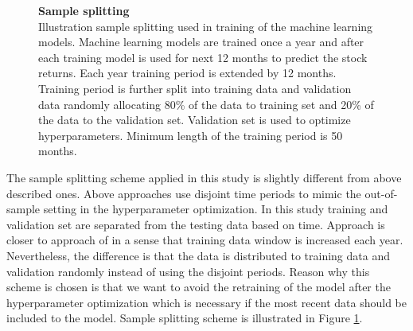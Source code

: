 \documentclass[12pt]{article}
\begin{document}
\begin{figure}[ht]
\centering
\caption[Sample splitting scheme]{\textbf{Sample splitting}\\ Illustration sample splitting used in training of the machine learning models. Machine learning models are trained once a year and after each training model is used for next 12 months to predict the stock returns. Each year training period is extended by 12 months. Training period is further split into training data and validation data randomly allocating 80\% of the data to training set and 20\% of the data to the validation set. Validation set is used to optimize hyperparameters. Minimum length of the training period is 50 months.}
\label{plot:SampleSplitting}
\end{figure}

The sample splitting scheme applied in this study is slightly different from above described ones. Above approaches use disjoint time periods to mimic the out-of-sample setting in the hyperparameter optimization. In this study training and validation set are separated from the testing data based on time. Approach is closer to approach of \citet{guetal} in a sense that training data window is increased each year. Nevertheless, the difference is that the data is distributed to training data and validation randomly instead of using the disjoint periods. Reason why this scheme is chosen is that we want to avoid the retraining of the model after the hyperparameter optimization which is necessary if the most recent data should be included to the model. Sample splitting scheme is illustrated in Figure \ref{plot:SampleSplitting}. \par
\end{document}
